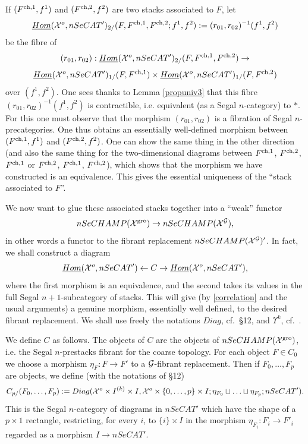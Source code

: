 If $(F^{\rm ch,1}, f^1)$ and $(F^{\rm ch,2}, f^2)$ are two stacks associated
to $F$, let
$$
\underline{Hom}({\cal X} ^o, nSeCAT')_{2/}(F,F^{\rm ch,1}, F^{\rm ch,2}; f^1, f^2)
:= (r_{01}, r_{02})^{-1}(f^1,f^2)
$$
be the fibre of
$$
(r_{01}, r_{02}): \underline{Hom}({\cal X} ^o, nSeCAT')_{2/}(F,F^{\rm ch,1}, F^{\rm
ch,2}) \rightarrow
$$
$$
\underline{Hom}({\cal X} ^o, nSeCAT')_{1/}(F,F^{\rm ch,1})
\times
\underline{Hom}({\cal X} ^o, nSeCAT')_{1/}(F, F^{\rm ch,2})
$$
over $(f^1,f^2)$. One sees thanks to Lemma \ref{propuniv3} that
this fibre $(r_{01}, r_{02})^{-1}(f^1,f^2)$ is contractible, i.e. equivalent
(as a Segal $n$-category) to $\ast$. For this
one must observe that the
morphism $(r_{01}, r_{02})$ is a fibration of Segal $n$-precategories.
One thus obtains an essentially well-defined morphism between
$(F^{\rm ch,1}, f^1)$ and $(F^{\rm ch,2}, f^2)$.
One can show the same thing in the other direction
(and also the same thing for the two-dimensional diagrams
between $F^{\rm ch,1}$, $F^{\rm ch,2}$, $F^{\rm ch,1}$ or
$F^{\rm ch,2}$, $F^{\rm ch,1}$, $F^{\rm ch,2}$), which shows that the morphism
we have constructed
is an equivalence. This gives the essential uniqueness of the ``stack
associated to $F$''.

We now want to glue these associated stacks together into a ``weak''
functor
$$
nSeCHAMP({\cal X} ^{\rm gro})\rightarrow nSeCHAMP({\cal X} ^{{\cal G}}),
$$
in other words a functor to the fibrant replacement
$nSeCHAMP({\cal X} ^{{\cal G}})'$. In fact, we shall construct a diagram
$$
\underline{Hom}({\cal X} ^o, nSeCAT')\leftarrow C\rightarrow
\underline{Hom}({\cal X} ^o, nSeCAT'),
$$
where the first morphism is an equivalence, and the second
takes its values in the
full Segal $n+1$-subcategory of stacks. This will give (by
\ref{correlation} and the usual arguments) a genuine morphism,
essentially well defined, to the desired fibrant replacement.
We shall use freely the notations $Diag$, cf.\ \S12, and $\Upsilon ^k$, cf.\
\cite{limits}.

We define $C$ as follows. The objects of $C$ are the objects of
\newline
$nSeCHAMP({\cal X} ^{\rm gro})$, i.e. the Segal $n$-prestacks fibrant
for the coarse topology. For each object $F\in C_0$ we choose a
morphism
$\eta _F: F\rightarrow F'$ to a ${\cal G}$-fibrant replacement.
Then if $F_0,\ldots ,
F_p$ are objects, we define (with the notations of \S12)
$$
C_{p/}(F_0,\ldots , F_p):= Diag({\cal X} ^o\times I^{(k)}\times I,
{\cal X} ^o\times \{ 0,\ldots , p\}
\times I;  \eta _{F_0}\sqcup \ldots \sqcup \eta _{F_p}; nSeCAT').
$$
This is the Segal $n$-category of diagrams in $nSeCAT'$ which have the shape
of a $p\times 1$ rectangle, restricting, for every $i$, to $\{ i\} \times I$
in the morphism $\eta _{F_i}: F_i\rightarrow F'_i$ regarded as a
morphism $I\rightarrow nSeCAT'$.

